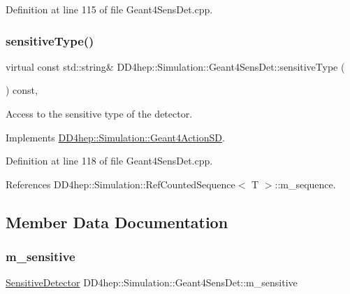 Definition at line 115 of file Geant4\+Sens\+Det.\+cpp.

\hypertarget{class_d_d4hep_1_1_simulation_1_1_geant4_sens_det_a90e504184bd398b1df950000c6aa3b8a}{}\label{class_d_d4hep_1_1_simulation_1_1_geant4_sens_det_a90e504184bd398b1df950000c6aa3b8a} 
\subsubsection{\texorpdfstring{sensitive\+Type()}{sensitiveType()}}
{\footnotesize\ttfamily virtual const std\+::string\& D\+D4hep\+::\+Simulation\+::\+Geant4\+Sens\+Det\+::sensitive\+Type (\begin{DoxyParamCaption}{ }\end{DoxyParamCaption}) const\hspace{0.3cm}{\ttfamily [inline]}, {\ttfamily [virtual]}}



Access to the sensitive type of the detector. 



Implements \hyperlink{class_d_d4hep_1_1_simulation_1_1_geant4_action_s_d_ad2aec470fc9632ab3082b51b16a75c00}{D\+D4hep\+::\+Simulation\+::\+Geant4\+Action\+SD}.



Definition at line 118 of file Geant4\+Sens\+Det.\+cpp.



References D\+D4hep\+::\+Simulation\+::\+Ref\+Counted\+Sequence$<$ T $>$\+::m\+\_\+sequence.



\subsection{Member Data Documentation}
\hypertarget{class_d_d4hep_1_1_simulation_1_1_geant4_sens_det_a0790d04fc8724269797452cb89b91d39}{}\label{class_d_d4hep_1_1_simulation_1_1_geant4_sens_det_a0790d04fc8724269797452cb89b91d39} 
\subsubsection{\texorpdfstring{m\+\_\+sensitive}{m\_sensitive}}
{\footnotesize\ttfamily \hyperlink{class_d_d4hep_1_1_simulation_1_1_geant4_action_s_d_a8a292947ea3f9b419728ef729a7e3fae}{Sensitive\+Detector} D\+D4hep\+::\+Simulation\+::\+Geant4\+Sens\+Det\+::m\+\_\+sensitive\hspace{0.3cm}{\ttfamily [protected]}}



